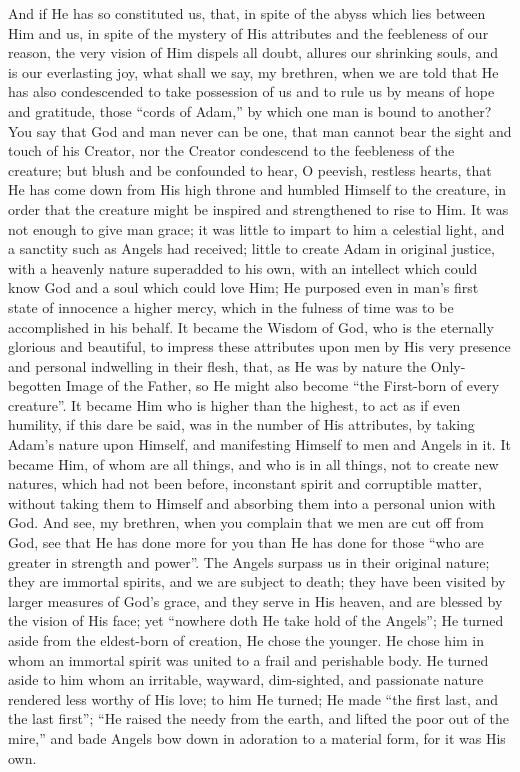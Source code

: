 And if He has so constituted us, that, in spite of the abyss which
lies between Him and us, in spite of the mystery of His attributes and
the feebleness of our reason, the very vision of Him dispels all
doubt, allures our shrinking souls, and is our everlasting joy, what
shall we say, my brethren, when we are told that He has also
condescended to take possession of us and to rule us by means of hope
and gratitude, those ``cords of Adam,'' by which one man is
bound to another? You say that God and man never can be one, that man
cannot bear the sight and touch of his Creator, nor the Creator
condescend to the feebleness of the creature; but blush and be
confounded to hear, O peevish, restless hearts, that He has come down
from His high throne and humbled Himself to the creature, in order
that the creature might be inspired and strengthened to rise to Him.
It was not enough to give man grace; it was little to impart to him a
celestial light, and a sanctity such as Angels had received; little to
create Adam in original justice, with a heavenly nature superadded to
his own, with an intellect which could know God and a soul which could
love Him; He purposed even in man's first state of innocence a higher
mercy, which in the fulness of time was to be accomplished in his
behalf. It became the Wisdom of God, who is the eternally glorious and
beautiful, to impress these attributes upon men by His very presence
and personal indwelling in their flesh, that, as He was by nature the
Only-begotten Image of the Father, so He might also become ``the
First-born of every creature''. It became Him who is higher than
the highest, to act as if even humility, if this dare be said, was in
the number of His attributes, by taking Adam's nature upon Himself,
and manifesting Himself to men and Angels in it. It became Him, of
whom are all things, and who is in all things, not to create new
natures, which had not been before, inconstant spirit and corruptible
matter, without taking them to Himself and absorbing them into a
personal union with God. And see, my brethren, when you complain that
we men are cut off from God, see that He has done more for you than He
has done for those ``who are greater in strength and power''.
The Angels surpass us in their original nature; they are immortal
spirits, and we are subject to death; they have been visited by larger
measures of God's grace, and they serve in His heaven, and are blessed
by the vision of His face; yet ``nowhere doth He take hold of the
Angels''; He turned aside from the eldest-born of creation, He
chose the younger. He chose him in whom an immortal spirit was united
to a frail and perishable body. He turned aside to him whom an
irritable, wayward, dim-sighted, and passionate nature rendered less
worthy of His love; to him He turned; He made ``the first last,
and the last first''; ``He raised the needy from the earth,
and lifted the poor out of the mire,'' and bade Angels bow down in
adoration to a material form, for it was His own.

